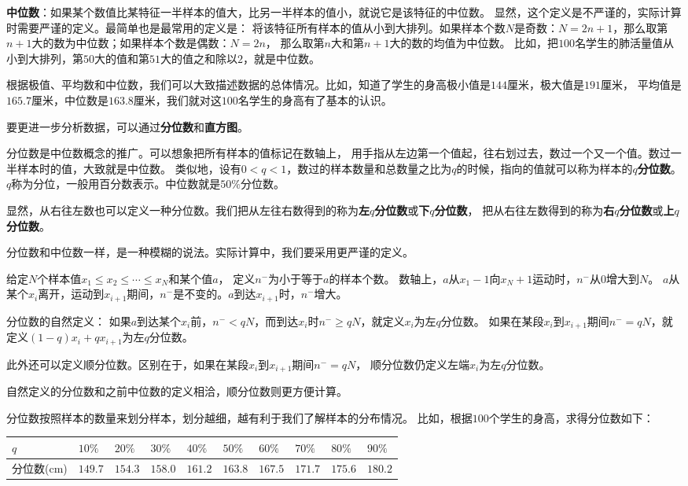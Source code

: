 \documentclass[12pt,UTF8]{ctexbook}
\theoremstyle{definition}
\theoremstyle{plain}
\begin{document}
\textbf{中位数}：如果某个数值比某特征一半样本的值大，比另一半样本的值小，就说它是该特征的中位数。
显然，这个定义是不严谨的，实际计算时需要严谨的定义。最简单也是最常用的定义是：
将该特征所有样本的值从小到大排列。如果样本个数$N$是奇数：$N = 2n + 1$，那么取第$n+1$大的数为中位数；如果样本个数是偶数：$N=2n$，
那么取第$n$大和第$n+1$大的数的均值为中位数。
比如，把$100$名学生的肺活量值从小到大排列，第$50$大的值和第$51$大的值之和除以$2$，就是中位数。

根据极值、平均数和中位数，我们可以大致描述数据的总体情况。比如，知道了学生的身高极小值是$144$厘米，极大值是$191$厘米，
平均值是$165.7$厘米，中位数是$163.8$厘米，我们就对这$100$名学生的身高有了基本的认识。

要更进一步分析数据，可以通过\textbf{分位数}和\textbf{直方图}。

分位数是中位数概念的推广。可以想象把所有样本的值标记在数轴上，
用手指从左边第一个值起，往右划过去，数过一个又一个值。数过一半样本时的值，大致就是中位数。
类似地，设有$0 < q < 1$，数过的样本数量和总数量之比为$q$的时候，指向的值就可以称为样本的$q$\textbf{分位数}。
$q$称为分位，一般用百分数表示。中位数就是$50\%$分位数。

显然，从右往左数也可以定义一种分位数。我们把从左往右数得到的称为\textbf{左}$q$\textbf{分位数}或\textbf{下}$q$\textbf{分位数}，
把从右往左数得到的称为\textbf{右}$q$\textbf{分位数}或\textbf{上}$q$\textbf{分位数}。

分位数和中位数一样，是一种模糊的说法。实际计算中，我们要采用更严谨的定义。

给定$N$个样本值$x_1 \leqslant x_2  \leqslant  \cdots  \leqslant x_N$和某个值$a$，
定义$n^{-}$为小于等于$a$的样本个数。
数轴上，$a$从$x_1 - 1$向$x_N + 1$运动时，$n^-$从$0$增大到$N$。
$a$从某个$x_i$离开，运动到$x_{i+1}$期间，$n^-$是不变的。$a$到达$x_{i+1}$时，$n^-$增大。

分位数的自然定义：
如果$a$到达某个$x_{i}$前，$n^- < qN$，而到达$x_{i}$时$n^- \geqslant qN$，就定义$x_{i}$为左$q$分位数。
如果在某段$x_i$到$x_{i+1}$期间$n^- = qN$，就定义$(1 - q)x_{i} + qx_{i+1}$为左$q$分位数。

此外还可以定义顺分位数。区别在于，如果在某段$x_i$到$x_{i+1}$期间$n^- = qN$，
顺分位数仍定义左端$x_i$为左$q$分位数。

自然定义的分位数和之前中位数的定义相洽，顺分位数则更方便计算。

分位数按照样本的数量来划分样本，划分越细，越有利于我们了解样本的分布情况。
比如，根据$100$个学生的身高，求得分位数如下：
\begin{center}
    \begin{tabular}{ | p{3.8em}<{\centering} | p{2em}<{\centering} | p{2em}<{\centering} | p{2em}<{\centering} | p{2em}<{\centering} | p{2em}<{\centering} | p{2em}<{\centering} | p{2em}<{\centering} | p{2em}<{\centering} | p{2em}<{\centering} | }
        \hline
            $q$   & $10\%$ & $20\%$ & $30\%$& $40\%$& $50\%$& $60\%$& $70\%$& $80\%$& $90\%$ \\ [0.5ex] 
        \hline
        {\scriptsize 分位数(cm)} & $149.7$ & $154.3$ & $158.0$ & $161.2$ & $163.8$ & $167.5$ & $171.7$ & $175.6$ & $180.2$ \\  
        \hline
    \end{tabular}
\end{center}
\end{document}

